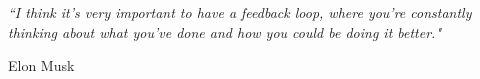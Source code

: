 \documentclass[11pt]{Thesis} %
\begin{document}
\clearpage %

\newpage
\thispagestyle{empty}
\mbox{}
\clearpage



\clearpage %
\newpage
\thispagestyle{empty}
\mbox{}
\clearpage



\pagestyle{empty} %

\null\vfill %

%

\textit{``I think it's very important to have a feedback loop, where you're constantly thinking about what you've done and how you could be doing it better."}

\begin{flushright}
Elon Musk 
\end{flushright}

%

\vfill\vfill\vfill\vfill\vfill\vfill\null %

\clearpage %
\newpage
\thispagestyle{empty}
\mbox{}
\clearpage




\end{document}
